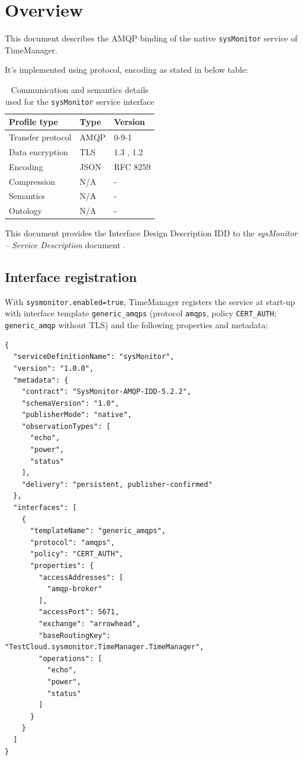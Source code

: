 \documentclass[a4paper]{arrowhead}
\begin{document}
\section{Overview}
\label{sec:overview}

This document describes the AMQP binding of the native \texttt{sysMonitor} service of TimeManager.

It's implemented using protocol, encoding as stated in below table:
\begin{table}[ht!]
  \centering
  \begin{tabular}{|l|l|l|}
    \hline
    \rowcolor{gray!33} Profile type & Type & Version \\ \hline
    Transfer protocol & AMQP & 0-9-1 \cite{amqp091} \\ \hline
    Data encryption & TLS & 1.3 \cite{rfc8446}, 1.2 \cite{rfc5246} \\ \hline
    Encoding & JSON & RFC 8259 \cite{rfc8259} \\ \hline
    Compression & N/A & - \\ \hline
    Semantics & N/A & - \\ \hline
    Ontology & N/A & - \\ \hline
  \end{tabular}
  \caption{Communication and semantics details used for the \texttt{sysMonitor} service interface}
  \label{tab:comunication_semantics_profile}
\end{table}

This document provides the Interface Design Description IDD to the \textit{sysMonitor -- Service Description} document \cite{tim-sysMonitor-sd}.

\subsection{Interface registration}

With \texttt{sysmonitor.enabled=true}, TimeManager registers the service at start-up with interface template \texttt{generic\_\allowbreak{}amqps} (protocol \texttt{amqps}, policy \texttt{CERT\_\allowbreak{}AUTH}; \texttt{generic\_\allowbreak{}amqp} without TLS) and the following properties and metadata:

\begin{lstlisting}[caption={Registered service instance (TestCloud).}]
{
  "serviceDefinitionName": "sysMonitor",
  "version": "1.0.0",
  "metadata": {
    "contract": "SysMonitor-AMQP-IDD-5.2.2",
    "schemaVersion": "1.0",
    "publisherMode": "native",
    "observationTypes": [
      "echo",
      "power",
      "status"
    ],
    "delivery": "persistent, publisher-confirmed"
  },
  "interfaces": [
    {
      "templateName": "generic_amqps",
      "protocol": "amqps",
      "policy": "CERT_AUTH",
      "properties": {
        "accessAddresses": [
          "amqp-broker"
        ],
        "accessPort": 5671,
        "exchange": "arrowhead",
        "baseRoutingKey": "TestCloud.sysmonitor.TimeManager.TimeManager",
        "operations": [
          "echo",
          "power",
          "status"
        ]
      }
    }
  ]
}
\end{lstlisting}
\end{document}

